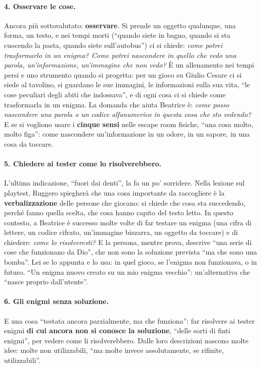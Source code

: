 \paragraph{4. Osservare le cose.} Ancora più sottovalutato: \textbf{osservare}. Si
prende un oggetto qualunque, una forma, un testo, e nei tempi morti (``quando siete in
bagno, quando si sta cuocendo la pasta, quando siete sull'autobus'') ci si chiede:
\emph{come potrei trasformarlo in un enigma? Come potrei nascondere in quello che vedo
una parola, un'informazione, un'immagine che non vedo?} È un allenamento nei tempi
persi e uno strumento quando si progetta: per un gioco su Giulio Cesare ci si siede al
tavolino, si guardano le sue immagini, le informazioni sulla sua vita, ``le cose
peculiari degli abiti che indossava'', e di ogni cosa ci si chiede come trasformarla
in un enigma. La domanda che aiuta Beatrice è: \emph{come posso nascondere una parola
o un codice alfanumerico in questa cosa che sto vedendo?} E se si vogliono usare i
\textbf{cinque sensi} nelle escape room fisiche, ``una cosa molto, molto figa'': come
nascondere un'informazione in un odore, in un sapore, in una cosa da toccare.

\paragraph{5. Chiedere ai tester come lo risolverebbero.} L'ultima indicazione, ``fuori
dai denti'', la fa un po' sorridere. Nella lezione sul playtest, Ruggero spiegherà che
una cosa importante da raccogliere è la \textbf{verbalizzazione} delle persone che
giocano: si chiede che cosa sta succedendo, perché fanno quella scelta, che cosa hanno
capito del testo letto. In questo contesto, a Beatrice è successo molte volte di far
testare un enigma (una cifra di lettere, un codice cifrato, un'immagine bizzarra, un
oggetto da toccare) e di chiedere: \emph{come lo risolveresti?} E la persona, mentre
prova, descrive ``una serie di cose che funzionano da Dio'', che non sono la soluzione
prevista ``ma che sono una bomba''. Lei se lo appunta e lo usa: in quel gioco, se
l'enigma non funzionava, o in futuro. ``Un enigma nuovo creato su un mio enigma
vecchio'': un'alternativa che ``nasce proprio dall'utente''.

\paragraph{6. Gli enigmi senza soluzione.} E una cosa ``testata ancora parzialmente,
ma che funziona'': far risolvere ai tester enigmi \textbf{di cui ancora non si conosce
la soluzione}, ``delle sorti di finti enigmi'', per vedere come li risolverebbero.
Dalle loro descrizioni nascono molte idee: molte non utilizzabili, ``ma molte invece
assolutamente, se rifinite, utilizzabili''.

